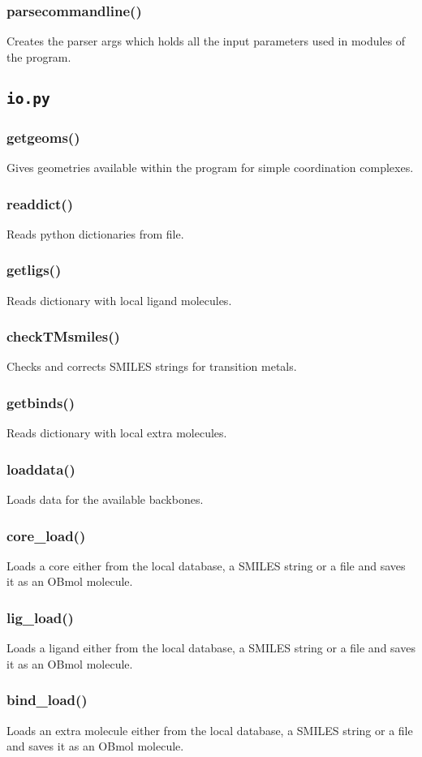 \documentclass[a4paper,12pt]{assignment}
\begin{document}
\subsubsection{parsecommandline()}
Creates the parser args which holds all the input parameters used in modules of the program.

\subsection{\texttt{io.py}}
\subsubsection{getgeoms()}
Gives geometries available within the program for simple coordination complexes.
\subsubsection{readdict()}
Reads python dictionaries from file.
\subsubsection{getligs()}
Reads dictionary with local ligand molecules.
\subsubsection{checkTMsmiles()}
Checks and corrects SMILES strings for transition metals.
\subsubsection{getbinds()}
Reads dictionary with local extra molecules.
\subsubsection{loaddata()}
Loads data for the available backbones.
\subsubsection{core_load()}
Loads a core either from the local database, a SMILES string or a file and saves it as an OBmol molecule.
\subsubsection{lig_load()}
Loads a ligand either from the local database, a SMILES string or a file and saves it as an OBmol molecule.
\subsubsection{bind_load()}
Loads an extra molecule either from the local database, a SMILES string or a file and saves it as an OBmol molecule.
\end{document}
